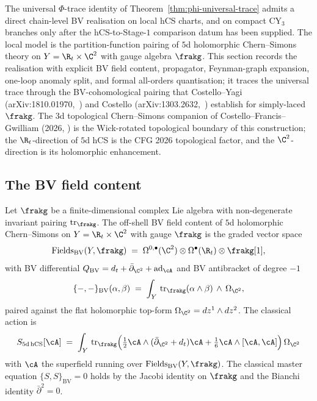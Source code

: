 The universal $\Phi$-trace identity of
Theorem~\ref{thm:phi-universal-trace} admits a direct chain-level BV
realisation on local hCS charts, and on compact CY$_3$ branches only
after the hCS-to-Stage-$1$ comparison datum has been supplied. The local
model is the partition-function pairing of $5$d holomorphic
Chern--Simons theory on $Y = \R_t\times\C^2$ with gauge algebra
$\frakg$. This section records the realisation with explicit BV
field content, propagator, Feynman-graph expansion, one-loop anomaly
split, and formal all-orders quantisation; it traces the universal
trace through the BV-cohomological pairing that Costello--Yagi
\textup{(}arXiv:1810.01970,~\cite{CostelloYagi2018}\textup{)} and
Costello \textup{(}arXiv:1303.2632,~\cite{Costello2013}\textup{)}
establish for simply-laced $\frakg$. The $3$d topological Chern--Simons
companion of Costello--Francis--Gwilliam \textup{(}2026,
\cite{CFG2026}\textup{)} is the Wick-rotated topological boundary of
this construction; the $\R_t$-direction of $5$d hCS is the CFG 2026
topological factor, and the $\C^2$-direction is its holomorphic
enhancement.

\subsection{The BV field content}
\label{subsec:phiutp-5d-hcs-bv-fields}

\begin{definition}
\label{def:phiutp-5d-hcs-bv-fields}
Let $\frakg$ be a finite-dimensional complex Lie algebra with
non-degenerate invariant pairing $\mathrm{tr}_\frakg$. The off-shell
BV field content of $5$d holomorphic Chern--Simons on
$Y = \R_t\times\C^2$ with gauge $\frakg$ is the graded vector space
\[
 \mathrm{Fields}_{\mathrm{BV}}(Y, \frakg)
 \;=\; \Omega^{0,\bullet}(\C^2)\otimes \Omega^\bullet(\R_t)\otimes \frakg[1],
\]
with BV differential
$Q_{\mathrm{BV}} = d_t + \bar\partial_{\C^2} + \mathrm{ad}_{\cA}$
and BV antibracket of degree $-1$
\[
 \{-,-\}_{\mathrm{BV}}(\alpha, \beta)
 \;=\; \int_{Y}\, \mathrm{tr}_\frakg(\alpha\wedge\beta)\,
 \wedge\, \Omega_{\C^2},
\]
paired against the flat holomorphic top-form
$\Omega_{\C^2} = dz^1\wedge dz^2$. The classical action is
\begin{equation}
\label{eq:phiutp-5d-hCS-action}
 S_{5\mathrm{d\,hCS}}[\cA]
 \;=\; \int_{Y}\, \mathrm{tr}_\frakg
 \Bigl(\tfrac{1}{2}\cA\wedge(\bar\partial_{\C^2}+d_t)\cA
 + \tfrac{1}{6}\cA\wedge [\cA, \cA]\Bigr)\, \Omega_{\C^2}
\end{equation}
with $\cA$ the superfield running over
$\mathrm{Fields}_{\mathrm{BV}}(Y, \frakg)$. The classical master equation
$\{S, S\}_{\mathrm{BV}} = 0$ holds by the Jacobi identity on $\frakg$
and the Bianchi identity $\bar\partial^2 = 0$.
\end{definition}

